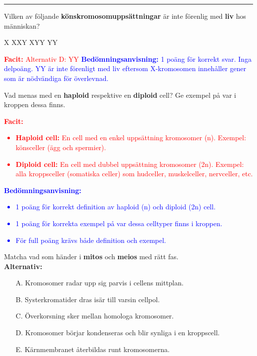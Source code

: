 \documentclass{exam}
\newcommand{\facit}[1]{\textcolor{red}{\textbf{Facit:} #1}}
\newcommand{\bedomning}[1]{\textcolor{blue}{\textbf{Bedömningsanvisning:} #1}}
\begin{document}
\begin{questions}
\vspace{5mm}\hrule\vspace{5mm}
\question Vilken av följande \textbf{könskromosomuppsättningar} är inte förenlig med \textbf{liv} hos människan?
\begin{checkboxes}
   \choice X 
   \choice XXY
   \choice XYY
   \correctchoice YY
\end{checkboxes}
\facit{Alternativ D: YY}
\bedomning{1 poäng för korrekt svar. Inga delpoäng. YY är inte förenligt med liv eftersom X-kromosomen innehåller gener som är nödvändiga för överlevnad.}

\break

\vspace{5mm}
\begin{center}
\end{center}
\vspace{5mm}

\question Vad menas med en \textbf{haploid} respektive en \textbf{diploid} cell? Ge exempel på var i kroppen dessa finns.
\vspace{5mm}

\facit{
\begin{itemize}
    \item \textbf{Haploid cell:} En cell med en enkel uppsättning kromosomer (n). Exempel: könsceller (ägg och spermier).
    \item \textbf{Diploid cell:} En cell med dubbel uppsättning kromosomer (2n). Exempel: alla kroppsceller (somatiska celler) som hudceller, muskelceller, nervceller, etc.
\end{itemize}
}

\bedomning{
\begin{itemize}
    \item 1 poäng för korrekt definition av haploid (n) och diploid (2n) cell.
    \item 1 poäng för korrekta exempel på var dessa celltyper finns i kroppen.
    \item För full poäng krävs både definition och exempel.
\end{itemize}
}
\vspace{10mm}

\question Matcha vad som händer i \textbf{mitos} och \textbf{meios} med rätt fas.\\

\textbf{Alternativ:}
\begin{itemize}
  \item[A.] Kromosomer radar upp sig parvis i cellens mittplan.
  \item[B.] Systerkromatider dras isär till varsin cellpol.
  \item[C.] Överkorsning sker mellan homologa kromosomer.
  \item[D.] Kromosomer börjar kondenseras och blir synliga i en kroppscell.
  \item[E.] Kärnmembranet återbildas runt kromosomerna.
\end{itemize}


\end{questions}
\end{document}
